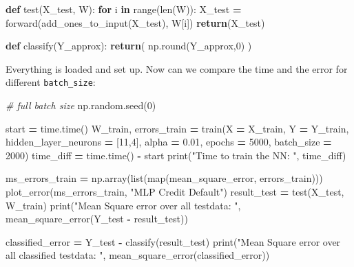 \documentclass[
]{book}
\newenvironment{Shaded}{\begin{snugshade}}{\end{snugshade}}
\newcommand{\BuiltInTok}[1]{#1}
\newcommand{\CommentTok}[1]{\textcolor[rgb]{0.56,0.35,0.01}{\textit{#1}}}
\newcommand{\ControlFlowTok}[1]{\textcolor[rgb]{0.13,0.29,0.53}{\textbf{#1}}}
\newcommand{\DecValTok}[1]{\textcolor[rgb]{0.00,0.00,0.81}{#1}}
\newcommand{\FloatTok}[1]{\textcolor[rgb]{0.00,0.00,0.81}{#1}}
\newcommand{\KeywordTok}[1]{\textcolor[rgb]{0.13,0.29,0.53}{\textbf{#1}}}
\newcommand{\NormalTok}[1]{#1}
\newcommand{\OperatorTok}[1]{\textcolor[rgb]{0.81,0.36,0.00}{\textbf{#1}}}
\newcommand{\StringTok}[1]{\textcolor[rgb]{0.31,0.60,0.02}{#1}}
\begin{document}
\begin{Shaded}
\begin{Highlighting}[]
\KeywordTok{def}\NormalTok{ test(X\_test, W):}
  \ControlFlowTok{for}\NormalTok{ i }\KeywordTok{in} \BuiltInTok{range}\NormalTok{(}\BuiltInTok{len}\NormalTok{(W)):}
\NormalTok{    X\_test }\OperatorTok{=}\NormalTok{ forward(add\_ones\_to\_input(X\_test), W[i])}
  \ControlFlowTok{return}\NormalTok{(X\_test)}
  
\KeywordTok{def}\NormalTok{ classify(Y\_approx):}
  \ControlFlowTok{return}\NormalTok{( np.}\BuiltInTok{round}\NormalTok{(Y\_approx,}\DecValTok{0}\NormalTok{) )}
\end{Highlighting}
\end{Shaded}

Everything is loaded and set up. Now can we compare the time and the error for different \texttt{batch\_size}:

\begin{Shaded}
\begin{Highlighting}[]
\CommentTok{\# full batch size}
\NormalTok{np.random.seed(}\DecValTok{0}\NormalTok{)}

\NormalTok{start }\OperatorTok{=}\NormalTok{ time.time()}
\NormalTok{W\_train, errors\_train }\OperatorTok{=}\NormalTok{ train(X }\OperatorTok{=}\NormalTok{ X\_train, Y }\OperatorTok{=}\NormalTok{ Y\_train, hidden\_layer\_neurons }\OperatorTok{=}\NormalTok{ [}\DecValTok{11}\NormalTok{,}\DecValTok{4}\NormalTok{], alpha }\OperatorTok{=} \FloatTok{0.01}\NormalTok{, epochs }\OperatorTok{=} \DecValTok{5000}\NormalTok{, batch\_size }\OperatorTok{=} \DecValTok{2000}\NormalTok{)}
\NormalTok{time\_diff }\OperatorTok{=}\NormalTok{ time.time() }\OperatorTok{{-}}\NormalTok{ start}
\BuiltInTok{print}\NormalTok{(}\StringTok{"Time to train the NN: "}\NormalTok{, time\_diff)}

\NormalTok{ms\_errors\_train }\OperatorTok{=}\NormalTok{ np.array(}\BuiltInTok{list}\NormalTok{(}\BuiltInTok{map}\NormalTok{(mean\_square\_error, errors\_train)))}
\NormalTok{plot\_error(ms\_errors\_train, }\StringTok{"MLP Credit Default"}\NormalTok{)}
\NormalTok{result\_test }\OperatorTok{=}\NormalTok{ test(X\_test, W\_train)}
\BuiltInTok{print}\NormalTok{(}\StringTok{"Mean Square error over all testdata: "}\NormalTok{, mean\_square\_error(Y\_test }\OperatorTok{{-}}\NormalTok{ result\_test))}

\NormalTok{classified\_error }\OperatorTok{=}\NormalTok{ Y\_test }\OperatorTok{{-}}\NormalTok{ classify(result\_test)}
\BuiltInTok{print}\NormalTok{(}\StringTok{"Mean Square error over all classified testdata: "}\NormalTok{, mean\_square\_error(classified\_error))}


\end{Highlighting}
\end{Shaded}
\end{document}
